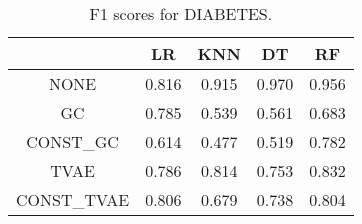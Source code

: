 \begin{table}
\caption{F1 scores for DIABETES.}
\label{tab:f1-DIABETES}
\begin{tabular}{ccccc}
\toprule
 & LR & KNN & DT & RF \\
\midrule
NONE & 0.816 & 0.915 & 0.970 & 0.956 \\
GC & 0.785 & 0.539 & 0.561 & 0.683 \\
CONST\_GC & 0.614 & 0.477 & 0.519 & 0.782 \\
TVAE & 0.786 & 0.814 & 0.753 & 0.832 \\
CONST\_TVAE & 0.806 & 0.679 & 0.738 & 0.804 \\
\bottomrule
\end{tabular}
\end{table}
